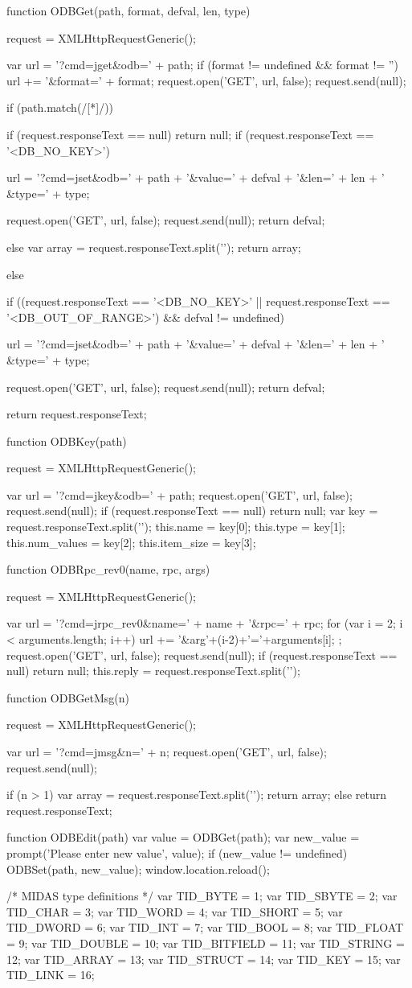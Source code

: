\begin{DoxyCode}
function ODBGet(path, format, defval, len, type)
{
   request = XMLHttpRequestGeneric();

   var url = '?cmd=jget&odb=' + path;
   if (format != undefined && format != '')
      url += '&format=' + format;
   request.open('GET', url, false);
   request.send(null);

   if (path.match(/[*]/)) {
      if (request.responseText == null)
         return null;
     if (request.responseText == '<DB_NO_KEY>') {
         url = '?cmd=jset&odb=' + path + '&value=' + defval + '&len=' + len + '
&type=' + type;

         request.open('GET', url, false);
         request.send(null);
         return defval;
      } else {
         var array = request.responseText.split('\n');
         return array;
      }
   } else {
      if ((request.responseText == '<DB_NO_KEY>' ||
           request.responseText == '<DB_OUT_OF_RANGE>') && defval != undefined)
 {
         url = '?cmd=jset&odb=' + path + '&value=' + defval + '&len=' + len + '
&type=' + type;

         request.open('GET', url, false);
         request.send(null);
         return defval;
      }
      return request.responseText;
   }
}

function ODBKey(path)
{
   request = XMLHttpRequestGeneric();

   var url = '?cmd=jkey&odb=' + path;
   request.open('GET', url, false);
   request.send(null);
   if (request.responseText == null)
      return null;
   var key = request.responseText.split('\n');
   this.name = key[0];
   this.type = key[1];
   this.num_values = key[2];
   this.item_size = key[3];
}

function ODBRpc_rev0(name, rpc, args)
{
   request = XMLHttpRequestGeneric();

   var url = '?cmd=jrpc_rev0&name=' + name + '&rpc=' + rpc;
   for (var i = 2; i < arguments.length; i++) {
     url += '&arg'+(i-2)+'='+arguments[i];
   };
   request.open('GET', url, false);
   request.send(null);
   if (request.responseText == null)
      return null;
   this.reply = request.responseText.split('\n');
}

function ODBGetMsg(n)
{
   request = XMLHttpRequestGeneric();

   var url = '?cmd=jmsg&n=' + n;
   request.open('GET', url, false);
   request.send(null);

   if (n > 1) {
     var array = request.responseText.split('\n');
      return array;
   } else
      return request.responseText;
}

function ODBEdit(path)
{
   var value = ODBGet(path);
   var new_value = prompt('Please enter new value', value);
   if (new_value != undefined) {
      ODBSet(path, new_value);
      window.location.reload();
   }
}

/* MIDAS type definitions */
var TID_BYTE = 1;
var TID_SBYTE = 2;
var TID_CHAR = 3;
var TID_WORD = 4;
var TID_SHORT = 5;
var TID_DWORD = 6;
var TID_INT = 7;
var TID_BOOL = 8;
var TID_FLOAT = 9;
var TID_DOUBLE = 10;
var TID_BITFIELD = 11;
var TID_STRING = 12;
var TID_ARRAY = 13;
var TID_STRUCT = 14;
var TID_KEY = 15;
var TID_LINK = 16;
\end{DoxyCode}
 \label{index_end}
\hypertarget{index_end}{}
  \par
 